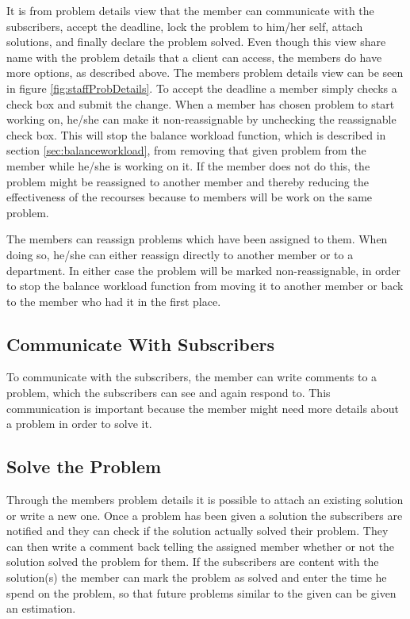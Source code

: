 It is from problem details view that the \astaff[] member can communicate with the subscribers, accept the deadline, lock the problem to him/her self, attach solutions, and finally declare the problem solved.
Even though this view share name with the problem details that a client can access, the \astaff[] members do have more options, as described above.
The \astaff[] members problem details view can be seen in figure \ref{fig:staffProbDetails}.
To accept the deadline a \astaff[] member simply checks a check box and submit the change.
When a \staff[] member has chosen problem to start working on, he/she can make it non-reassignable by unchecking the reassignable check box.
This will stop the balance workload function, which is described in section \ref{sec:balanceworkload}, from removing that given problem from the \astaff[] member while he/she is working on it.
If the \astaff[] member does not do this, the problem might be reassigned to another \astaff[] member and thereby reducing the effectiveness of the recourses because to \astaff[] members will be work on the same problem.

The \astaff[] members can reassign problems which have been assigned to them.
When doing so, he/she can either reassign directly to another \astaff[] member or to a department.
In either case the problem will be marked non-reassignable, in order to stop the balance workload function from moving it to another \astaff[] member or back to the \astaff[] member who had it in the first place.

\subsection{Communicate With Subscribers}
To communicate with the subscribers, the \astaff[] member can write comments to a problem, which the subscribers can see and again respond to.
This communication is important because the \astaff[] member might need more details about a problem in order to solve it.

\subsection{Solve the Problem}
Through the \staff[] members problem details it is possible to attach an existing solution or write a new one.
Once a problem has been given a solution the subscribers are notified and they can check if the solution actually solved their problem.
They can then write a comment back telling the assigned \astaff[] member whether or not the solution solved the problem for them.
If the subscribers are content with the solution(s) the \astaff[] member can mark the problem as solved and enter the time he spend on the problem, so that future problems similar to the given can be given an estimation.

